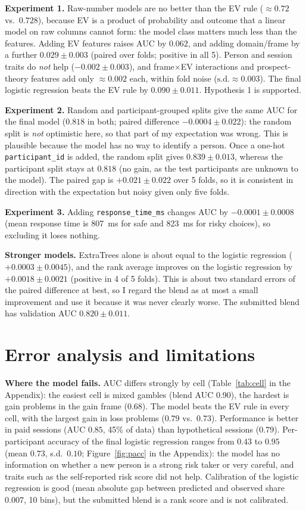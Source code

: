 \documentclass[11pt,a4paper]{article}
\begin{document}
\textbf{Experiment 1.} Raw-number models are no better than the EV rule ($\approx0.72$ vs.\ $0.728$), because EV is a
product of probability and outcome that a linear model on raw columns cannot form: the model class matters much
less than the features. Adding EV features raises AUC by $0.062$, and adding domain/frame by a further
$0.029\pm0.003$ (paired over folds; positive in all 5). Person and session traits do \emph{not} help
($-0.002\pm0.003$), and frame$\times$EV interactions and prospect-theory features add only $\approx0.002$ each, within
fold noise ($\mathrm{s.d.}\approx0.003$). The final logistic regression beats the EV rule by $0.090\pm0.011$.
Hypothesis 1 is supported.

\textbf{Experiment 2.} Random and participant-grouped splits give the same AUC for the final model ($0.818$ in
both; paired difference $-0.0004\pm0.022$): the random split is \emph{not} optimistic here, so that part of my
expectation was wrong. This is plausible because the model has no way to identify a person. Once a one-hot
\texttt{participant\_id} is added, the random split gives $0.839\pm0.013$, whereas the participant split stays at $0.818$
(no gain, as the test participants are unknown to the model). The paired gap is $+0.021\pm0.022$ over 5 folds, so it is
consistent in direction with the expectation but noisy given only five folds.

\textbf{Experiment 3.} Adding \texttt{response\_time\_ms} changes AUC by $-0.0001\pm0.0008$ (mean response time is 807~ms
for safe and 823~ms for risky choices), so excluding it loses nothing.

\textbf{Stronger models.} ExtraTrees alone is about equal to the logistic regression ($+0.0003\pm0.0045$), and the rank
average improves on the logistic regression by $+0.0018\pm0.0021$ (positive in 4 of 5 folds). This is about two standard errors
of the paired difference at best, so I regard the blend as at most a small improvement and use it because it was never
clearly worse. The submitted blend has validation AUC $0.820\pm0.011$.

\section{Error analysis and limitations}
\textbf{Where the model fails.} AUC differs strongly by cell (Table~\ref{tab:cell} in the Appendix): the easiest cell is
mixed gambles (blend AUC $0.90$), the hardest is gain problems in the gain frame ($0.68$). The model beats the EV rule in every
cell, with the largest gain in loss problems ($0.79$ vs.\ $0.73$). Performance is better in paid sessions (AUC $0.85$,
45\% of data) than hypothetical sessions ($0.79$). Per-participant accuracy of the final logistic regression ranges from $0.43$
to $0.95$ (mean $0.73$, s.d.\ $0.10$; Figure~\ref{fig:pacc} in the Appendix): the model has no information on whether a
new person is a strong risk taker or very careful, and traits such as the self-reported risk score did not
help. Calibration of the logistic regression is good (mean absolute gap between predicted and observed
share $0.007$, 10 bins), but the submitted blend is a rank score and is not calibrated.
\end{document}
